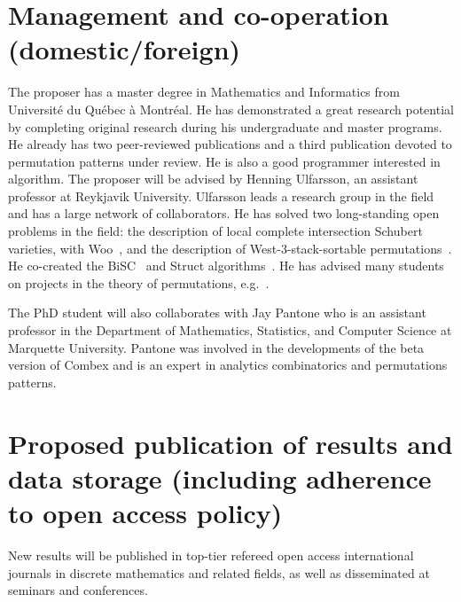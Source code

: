 \documentclass{rannis}
\newcommand{\motheralg}{\textsf{Combex}}
\newcommand{\bisc}{\textsf{BiSC}}
\newcommand{\struct}{\textsf{Struct}}
\theoremstyle{definition}
\begin{document}
\section{Management and co-operation (domestic/foreign)}
The proposer has a master degree in Mathematics and Informatics from
Universit\'e du Qu\'ebec \`a Montr\'eal. He has demonstrated a great research
potential by completing original research during his undergraduate and master
programs. He already has two peer-reviewed publications and a third publication
devoted to permutation patterns under review.
He is also a
good programmer interested in algorithm.
The proposer will be advised by Henning Ulfarsson, an assistant professor
at Reykjavik University. Ulfarsson leads a research group in the field and has
a large network of collaborators.
He has solved two long-standing open
problems in the field: the description of local complete intersection Schubert
varieties, with Woo~\cite{UW11}, and the description of West-$3$-stack-sortable
permutations~\cite{MR2971010}. He co-created the
\bisc{}~\cite{BiSC} and \struct{} algorithms~\cite{algstruct, structpaper}.
He has advised many students on projects in the theory of permutations,
e.g.~\cite{WilfOfShort, parti, MagnussonMSC, MurrayMSC, TomasMSc, BeanPhd}.

The PhD student will also collaborates with Jay Pantone who is an
assistant professor in the Department of Mathematics, Statistics, and Computer
Science at Marquette University.  Pantone was involved in the developments of
the beta version of \motheralg{} and is an expert in analytics combinatorics and
permutations patterns.
\\

\section{Proposed publication of results and data storage (including adherence to open access policy)}
New results will be published in top-tier refereed open access
international journals in discrete mathematics and related fields, as well as
disseminated at seminars and conferences.
\\%
\label{LastPageOfDescription}
\clearpage
\setcounter{page}{1}
\renewcommand{\lastpageref}{\pageref{LastPage}}%




\end{document}
